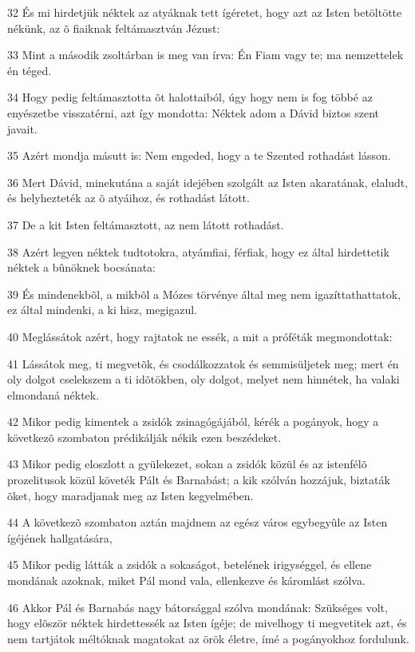 \par 32 És mi hirdetjük néktek az atyáknak tett ígéretet, hogy azt az Isten betöltötte nékünk, az õ fiaiknak feltámasztván Jézust:
\par 33 Mint a második zsoltárban is meg van írva: Én Fiam vagy te; ma nemzettelek én téged.
\par 34 Hogy pedig feltámasztotta õt halottaiból, úgy hogy nem is fog többé az enyészetbe visszatérni, azt így mondotta: Néktek adom a Dávid biztos  szent javait.
\par 35 Azért mondja másutt is: Nem engeded, hogy a te Szented rothadást lásson.
\par 36 Mert Dávid, minekutána a saját idejében szolgált az Isten akaratának, elaludt, és helyhezteték az õ atyáihoz, és rothadást látott.
\par 37 De a kit Isten feltámasztott, az nem látott rothadást.
\par 38 Azért legyen néktek tudtotokra, atyámfiai, férfiak, hogy ez által hirdettetik néktek a bûnöknek bocsánata:
\par 39 És mindenekbõl, a mikbõl a Mózes törvénye által meg nem igazíttathattatok, ez által mindenki, a ki hisz, megigazul.
\par 40 Meglássátok azért, hogy rajtatok ne essék, a mit a próféták megmondottak:
\par 41 Lássátok meg, ti megvetõk, és csodálkozzatok és semmisüljetek meg; mert én oly dolgot cselekszem a ti idõtökben, oly dolgot, melyet nem hinnétek, ha valaki elmondaná néktek.
\par 42 Mikor pedig kimentek a zsidók zsinagógájából, kérék a pogányok, hogy a következõ szombaton prédikálják nékik ezen beszédeket.
\par 43 Mikor pedig eloszlott a gyülekezet, sokan a zsidók közül és az istenfélõ prozelitusok közül követék Pált és Barnabást; a kik szólván hozzájuk, biztaták õket, hogy maradjanak meg az Isten  kegyelmében.
\par 44 A következõ szombaton aztán majdnem az egész város egybegyûle az Isten ígéjének hallgatására,
\par 45 Mikor pedig látták a zsidók a sokaságot, betelének irigységgel, és ellene mondának azoknak, miket Pál mond vala, ellenkezve és káromlást szólva.
\par 46 Akkor Pál és Barnabás nagy bátorsággal szólva mondának: Szükséges volt, hogy elõször néktek hirdettessék az Isten ígéje; de mivelhogy ti megvetitek azt, és nem tartjátok méltóknak magatokat az örök életre, ímé a pogányokhoz  fordulunk.
